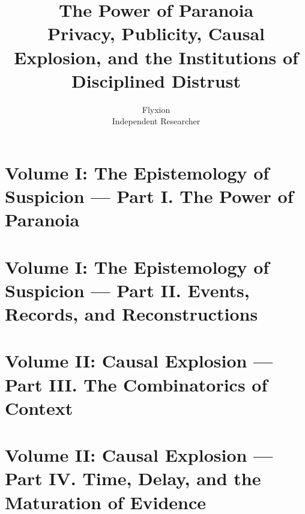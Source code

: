\documentclass[11pt]{book}
\title{The Power of Paranoia \\ \large Privacy, Publicity, Causal Explosion, and the Institutions of Disciplined Distrust}
\author{Flyxion \\ \small Independent Researcher}
\date{}
\begin{document}
\frontmatter
\maketitle

\tableofcontents

\mainmatter



\part{Volume I: The Epistemology of Suspicion --- Part I. The Power of Paranoia}






\part{Volume I: The Epistemology of Suspicion --- Part II. Events, Records, and Reconstructions}








\part{Volume II: Causal Explosion --- Part III. The Combinatorics of Context}







\part{Volume II: Causal Explosion --- Part IV. Time, Delay, and the Maturation of Evidence}








\end{document}
